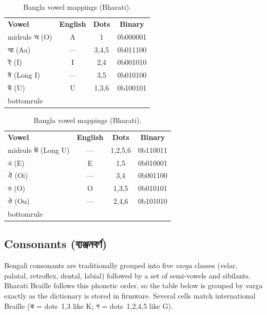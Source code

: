 \documentclass[11pt,a4paper,twoside]{article}
\newcommand{\bengali}[1]{#1}
\begin{document}
\begin{table}[H]\centering
\caption{Bangla vowel mappings (Bharati).}\label{tab:bangla-vowels}
\begin{minipage}{0.46\textwidth}
\begin{tabular}{l c c c}\toprule
\textbf{Vowel} & \textbf{English} & \textbf{Dots} & \textbf{Binary} \\midrule
অ (O)   & A     & 1       & 0b000001 \\
আ (Aa)  & ---   & 3,4,5   & 0b011100 \\
ই (I)   & I     & 2,4     & 0b001010 \\
ঈ (Long I) & --- & 3,5    & 0b010100 \\
উ (U)   & U     & 1,3,6   & 0b100101 \\bottomrule
\end{tabular}
\end{minipage}\hfill
\begin{minipage}{0.46\textwidth}
\begin{tabular}{l c c c}\toprule
\textbf{Vowel} & \textbf{English} & \textbf{Dots} & \textbf{Binary} \\midrule
ঊ (Long U) & --- & 1,2,5,6 & 0b110011 \\
এ (E)   & E     & 1,5     & 0b010001 \\
ঐ (Oi)  & ---   & 3,4     & 0b001100 \\
ও (O)   & O     & 1,3,5   & 0b010101 \\
ঔ (Ou)  & ---   & 2,4,6   & 0b101010 \\bottomrule
\end{tabular}
\end{minipage}
\end{table}

\subsection{Consonants (\bengali{ব্যঞ্জনবর্ণ})}
Bengali consonants are traditionally grouped into five \emph{varga} classes
(velar, palatal, retroflex, dental, labial) followed by a set of
semi-vowels and sibilants. Bharati Braille follows this phonetic order,
so the table below is grouped by varga exactly as the dictionary is
stored in firmware. Several cells match international Braille
(\bengali{ক} = dots~1,3 like K; \bengali{গ} = dots~1,2,4,5 like G).
\end{document}
